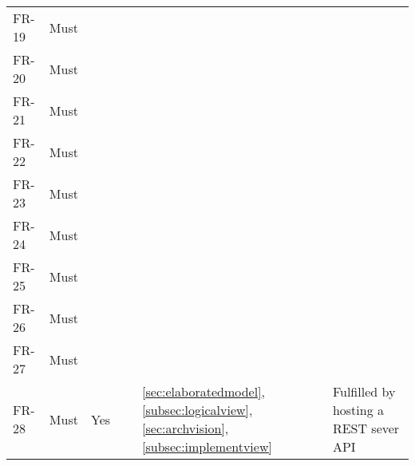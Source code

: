 \begin{table}[H]
\begin{tabular}{lllllL{0.5\textwidth}}
		FR-19 & Must     & ~        & ~         & ~         & ~         \\ 

		FR-20 & Must     & ~        & ~         & ~         & ~         \\ 

		FR-21 & Must     & ~        & ~         & ~         & ~         \\ 

		FR-22 & Must     & ~        & ~         & ~         & ~         \\ 

		FR-23 & Must     & ~        & ~         & ~         & ~         \\ 

		FR-24 & Must     & ~        & ~         & ~         & ~         \\ 

		FR-25 & Must     & ~        & ~         & ~         & ~         \\ 

		FR-26 & Must     & ~        & ~         & ~         & ~         \\ 

		FR-27 & Must     & ~        & ~         & ~         & ~         \\ 

		FR-28 & Must     & Yes        &          & \ref{sec:elaboratedmodel}, \ref{subsec:logicalview}, \ref{sec:archvision}, \ref{subsec:implementview} & Fulfilled by hosting a REST sever API\\ 


\end{tabular}
\end{table}
